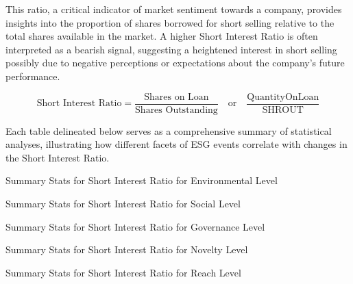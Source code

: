 This ratio, a critical indicator of market sentiment towards a company, provides insights into the proportion of shares borrowed for short selling relative to the total shares available in the market. A higher Short Interest Ratio is often interpreted as a bearish signal, suggesting a heightened interest in short selling possibly due to negative perceptions or expectations about the company's future performance.

 \begin{equation}
	\text{Short Interest Ratio} = \frac{\text{Shares on Loan}}{\text{Shares Outstanding}} \quad \text{or} \quad \frac{\text{QuantityOnLoan}}{\text{SHROUT}}
	\label{eq:Short_Interest_Ratio}
\end{equation}

Each table delineated below serves as a comprehensive summary of statistical analyses, illustrating how different facets of ESG events correlate with changes in the Short Interest Ratio.

\begin{table}[H]
\caption{Summary Stats for Short Interest Ratio for Environmental Level}
\centering

\label{table:short_interest_ratio_environment.tex}
\end{table}

\begin{table}[H]
\caption{Summary Stats for Short Interest Ratio for Social Level}
\centering

\label{table:short_interest_ratio_social.tex}
\end{table}

\begin{table}[H]
\caption{Summary Stats for Short Interest Ratio for Governance Level}
\centering

\label{table:short_interest_ratio_governance.tex}
\end{table}


\begin{table}[H]
\caption{Summary Stats for Short Interest Ratio for Novelty Level}
\centering

\label{table:short_interest_ratio_novelty.tex}
\end{table}

\begin{table}[H]
\caption{Summary Stats for Short Interest Ratio for Reach Level}
\centering

\label{table:short_interest_ratio_reach.tex}
\end{table}

